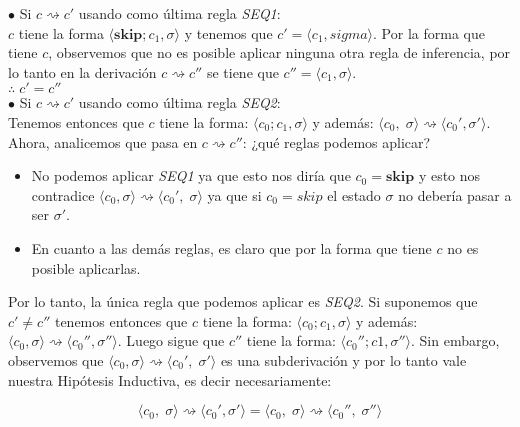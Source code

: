 \documentclass[11pt]{article}
\begin{document}

$\bullet$ Si $ c \rightsquigarrow c' $ usando como última regla \emph{SEQ1}: \\
$c$ tiene la forma $\langle \textbf{skip};c_1, \sigma \rangle$ y tenemos que $c' = \langle c_1, sigma \rangle$.
Por la forma que tiene $c$, observemos que no es posible aplicar ninguna otra regla
de inferencia, por lo tanto en la derivación $ c \rightsquigarrow c'' $ se tiene que
$c'' = \langle c_1, \sigma \rangle$. \\

$\therefore \; c' = c''$ \\


$\bullet$ Si $ c \rightsquigarrow c' $ usando como última regla \emph{SEQ2}: \\
Tenemos entonces que $c$ tiene la forma: $\langle c_0;c_1, \sigma \rangle$ y
además:  $ \langle c_0, \; \sigma \rangle \rightsquigarrow \langle c_0', \sigma' \rangle$.
Ahora, analicemos que pasa en $ c \rightsquigarrow c'' $: ¿qué reglas podemos aplicar?

\begin{itemize}
      \item No podemos aplicar \emph{SEQ1} ya que esto nos diría que $c_0 = \textbf{skip}$ y esto
            nos contradice $ \langle c_0, \sigma \rangle \rightsquigarrow \langle c_0', \; \sigma \rangle$ ya que
            si $c_0 = skip$ el estado $\sigma$ no debería pasar a ser $\sigma'$.
      \item En cuanto a las demás reglas, es claro que por la forma que tiene $c$ no es
            posible aplicarlas.
\end{itemize}

Por lo tanto, la única regla que podemos aplicar es \emph{SEQ2}. Si suponemos que 
$c' \neq c''$ tenemos entonces que $c$ tiene la forma: $\langle c_0;c_1,\sigma \rangle$ y
además:  $ \langle c_0, \sigma \rangle \rightsquigarrow \langle c_0'', \sigma'' \rangle$.
Luego sigue que $c''$ tiene la forma: $ \langle c_0'';c1, \sigma'' \rangle$.
Sin embargo, observemos que $ \langle c_0, \sigma \rangle \rightsquigarrow \langle c_0', \; \sigma' \rangle$
es una subderivación y por lo tanto vale nuestra Hipótesis Inductiva, es decir necesariamente:

\begin{equation*}
 \langle c_0, \; \sigma \rangle \rightsquigarrow \langle c_0', \sigma' \rangle = \langle c_0, \; \sigma \rangle \rightsquigarrow \langle c_0'', \; \sigma'' \rangle
\end{equation*}
\end{document}
